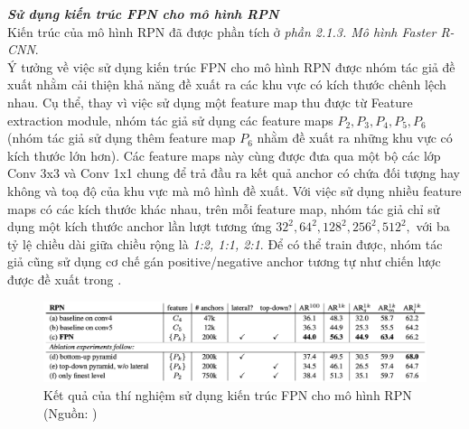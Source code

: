 {    \noindent
    \textbf{\textit{Sử dụng kiến trúc FPN cho mô hình RPN}} \\
    Kiến trúc của mô hình RPN đã được phần tích ở \textit{phần 2.1.3. Mô hình Faster R-CNN}. \\
    Ý tưởng về việc sử dụng kiến trúc FPN cho mô hình RPN được nhóm tác giả đề xuất nhằm cải thiện khả năng đề xuất ra các khu vực có kích thước chênh lệch nhau.
    Cụ thể, thay vì việc sử dụng một feature map thu được từ Feature extraction module, nhóm tác giả sử dụng các feature maps \textit{{${P}_{2}, {P}_{3}, {P}_{4}, {P}_{5}, {P}_{6}$}} (nhóm tác giả sử dụng thêm feature map ${P}_{6}$ nhằm đề xuất ra những khu vực có kích thước lớn hơn).
    Các feature maps này cùng được đưa qua một bộ các lớp Conv 3x3 và Conv 1x1 chung để trả đầu ra kết quả anchor có chứa đối tượng hay không và toạ độ của khu vực mà mô hình đề xuất.
    Với việc sử dụng nhiều feature maps có các kích thước khác nhau, trên mỗi feature map, nhóm tác giả chỉ sử dụng một kích thước anchor lần lượt tương ứng \textit{{${32}^{2}, {64}^{2}, {128}^{2}, {256}^{2}, {512}^{2},$}} với ba tỷ lệ chiều dài giữa chiều rộng là \textit{1:2, 1:1, 2:1}.
    Để có thể train được, nhóm tác giả cũng sử dụng cơ chế gán positive/negative anchor tương tự như chiến lược được đề xuất trong \cite{ren2015faster}.

    \begin{figure}[H]
        \centering
        \includegraphics[width=12cm] {images/fpn_results_1}
        \caption{Kết quả của thí nghiệm sử dụng kiến trúc FPN cho mô hình RPN (Nguồn: \cite{lin2017feature})}
        \label{fig:fpn_results}
    \end{figure}

}

